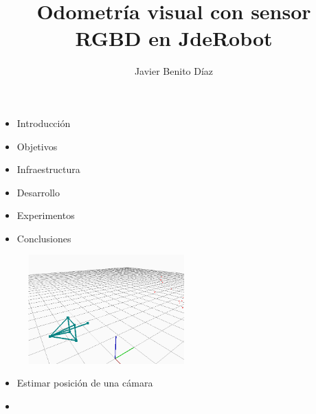 \documentclass[notes,slidesec,a4]{seminar}
\title{Odometría visual con sensor RGBD en JdeRobot}
\author{Javier Benito Díaz}
\begin{document}
\maketitle


\begin{hslide}
	\begin{itemize}
		\item Introducción 
		\item Objetivos
		\item Infraestructura
		\item Desarrollo
		\item Experimentos
		\item Conclusiones
	\end{itemize}
\end{hslide}


\begin{hslide}
	\begin{minipage}{6cm}
		\begin{center}
			\begin{figure}
				\includegraphics[width=6.0cm]{img/camera-opengl.png}
			\end{figure}
		\end{center}
	\end{minipage} \hfill
	\begin{minipage}{6cm}
		\begin{itemize}
			\item Estimar posición de una cámara
			\item 
		\end{itemize}
	\end{minipage}
\end{hslide}

\end{document}
